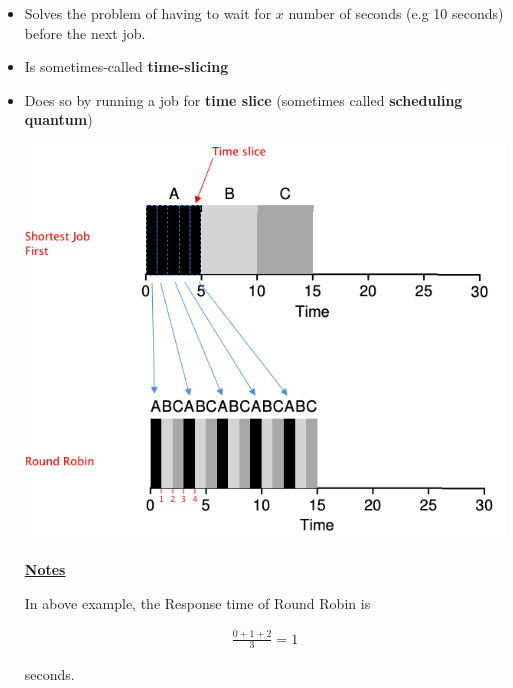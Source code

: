 \documentclass[12pt]{article}
\begin{document}
\begin{enumerate}[1.]
\begin{itemize}
        \begin{itemize}
            \item Solves the problem of having to wait for $x$ number of seconds (e.g 10 seconds)
            before the next job.
            \item Is sometimes-called \textbf{time-slicing}
            \item Does so by running a job for \textbf{time slice} (sometimes called \textbf{scheduling quantum})


            \begin{center}
            \includegraphics[width=0.8\linewidth]{images/worksheet_4_solution_4.png}
            \end{center}

            \bigskip

            \underline{\textbf{Notes}}

            \bigskip

            In above example, the Response time of Round Robin is

            \begin{align}
                \frac{0 + 1 + 2}{3} = 1
            \end{align}

            seconds.
        \end{itemize}
    \end{itemize}

\end{enumerate}
\end{document}
